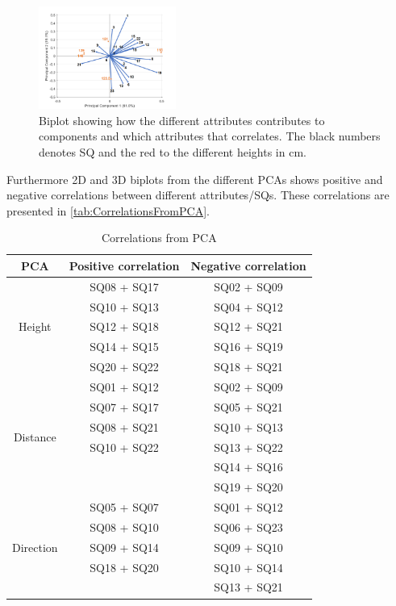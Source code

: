 %
\begin{figure}
	\centering
	\includegraphics[width = 0.40\textwidth]{Figure/RHeight-Biplot.png}
	\caption{Biplot showing how the different attributes contributes to components and which attributes that correlates. The black numbers denotes SQ and the red to the different heights in cm.}
	\label{fig:biplot}
\end{figure}
\noindent
%
Furthermore 2D and 3D biplots from the different PCAs shows positive and negative correlations between different attributes/SQs. These correlations are presented in \autoref{tab:CorrelationsFromPCA}.
%
\begin{table}
	\centering
	\caption{Correlations from PCA}
	\label{tab:CorrelationsFromPCA} 
	\begin{tabular}{ c|c|c }
		\centering
		PCA & Positive correlation & Negative correlation \\ \hline
		\multirow{5}{*}{Height} & SQ08  + SQ17 & SQ02  + SQ09 \\
		& SQ10 + SQ13 & SQ04 + SQ12 \\
		& SQ12 + SQ18 & SQ12 + SQ21 \\
		& SQ14 + SQ15 & SQ16 + SQ19 \\
		& SQ20 + SQ22 & SQ18 + SQ21\\ \hline
		\multirow{6}{*}{Distance} & SQ01 + SQ12 & SQ02 + SQ09 \\
		& SQ07 + SQ17 & SQ05 + SQ21 \\
		& SQ08 + SQ21 & SQ10 + SQ13 \\
		& SQ10 + SQ22 & SQ13 + SQ22 \\
		&  & SQ14 + SQ16 \\	
		&  & SQ19 + SQ20 \\ \hline	
		\multirow{5}{*}{Direction} 
		& SQ05 + SQ07 & SQ01 + SQ12 \\
		& SQ08 + SQ10 & SQ06 + SQ23 \\
		& SQ09 + SQ14 & SQ09 + SQ10 \\
		& SQ18 + SQ20 & SQ10 + SQ14 \\
		&  & SQ13 + SQ21
	
	\end{tabular}        
\end{table}
\noindent
%

